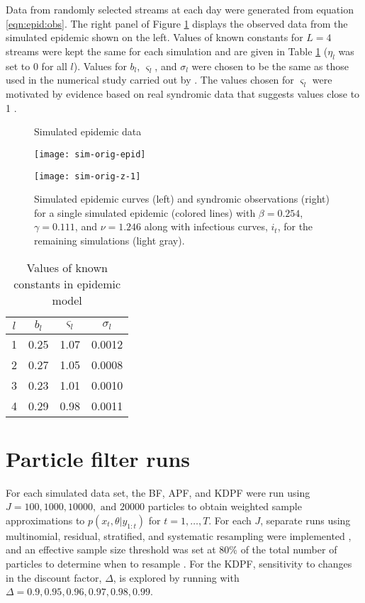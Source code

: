 Data from randomly selected streams at each day were generated from equation \eqref{eqn:epid:obs}. The right panel of Figure \ref{fig:epid:data} displays the observed data from the simulated epidemic shown on the left. Values of known constants for $L = 4$ streams were kept the same for each simulation and are given in Table \ref{tab:epid:constants} ($\eta_l$ was set to 0 for all $l$). Values for $b_l$, $\varsigma_l$, and $\sigma_l$ were chosen to be the same as those used in the numerical study carried out by \citet{skvortsov2012monitoring}. The values chosen for $\varsigma_l$ were motivated by evidence based on real syndromic data that suggests values close to 1 \citep{chew2010twitter}.

\begin{figure}
\ssp
\centering
\caption{Simulated epidemic data} \label{fig:epid:data}
\begin{minipage}{0.48\linewidth}
\texttt{[image: sim-orig-epid]}
\end{minipage}
\begin{minipage}{0.48\linewidth}
\texttt{[image: sim-orig-z-1]}
\end{minipage}
\caption*{Simulated epidemic curves (left) and syndromic observations (right) for a single simulated epidemic (colored lines) with $\beta = 0.254$, $\gamma = 0.111$, and $\nu = 1.246$ along with infectious curves, $i_t$, for the remaining simulations (light gray).}
\end{figure}

\begin{table}
\ssp
\centering
\caption{Values of known constants in epidemic model} \label{tab:epid:constants}
\begin{tabular}{|cccc|}
\hline
$l$ & $b_l$ & $\varsigma_l$ & $\sigma_l$ \\
\hline
1 & 0.25 & 1.07 & 0.0012 \\
2 & 0.27 & 1.05 & 0.0008 \\
3 & 0.23 & 1.01 & 0.0010 \\
4 & 0.29 & 0.98 & 0.0011 \\
\hline
\end{tabular}
\end{table}

\section{Particle filter runs} \label{sec:epid:pf}

For each simulated data set, the BF, APF, and KDPF were run using $J = 100, 1000, 10000, \mbox{ and } 20000$ particles to obtain weighted sample approximations to $p(x_t,\theta|y_{1:t})$ for $t = 1,\ldots,T$. For each $J$, separate runs using multinomial, residual, stratified, and systematic resampling were implemented \citep{smcUtils}, and an effective sample size threshold was set at 80\% of the total number of particles to determine when to resample \citep{Liu:Chen:Wong:reje:1998}. For the KDPF, sensitivity to changes in the discount factor, $\Delta$, is explored by running with $\Delta = 0.9, 0.95, 0.96, 0.97, 0.98, 0.99$.

